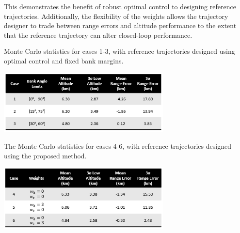 \documentclass[journal ]{new-aiaa}
\begin{document}
This demonstrates the benefit of robust optimal control to designing reference trajectories. Additionally, the flexibility of the weights allows the trajectory designer to trade between range errors and altitude performance to the extent that the reference trajectory can alter closed-loop performance. 
\begin{table}[h!]
	\centering
	\caption{Monte Carlo statistics for cases 1-3, with reference trajectories designed using optimal control and fixed bank margins.}
	\includegraphics[width=0.65\textwidth]{ddp/table_deterministic}
	\label{table_deterministic}
\end{table}
\begin{table}[h!]
	\centering
	\caption{The Monte Carlo statistics for cases 4-6, with reference trajectories designed using the proposed method.}
	\includegraphics[width=0.65\textwidth]{ddp/table_robust} %
	\label{table_robust}
\end{table}
\end{document}
